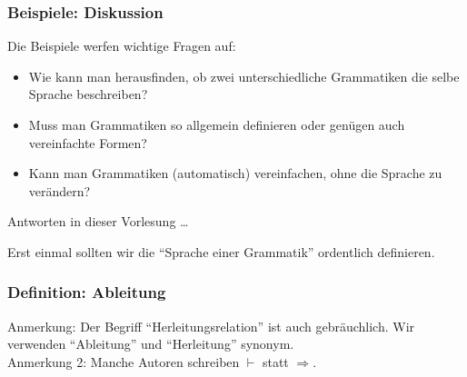 \documentclass[aspectratio=1610,onlymath]{beamer}
\begin{document}
\begin{frame}\frametitle{Beispiele: Diskussion}

Die Beispiele werfen \alert{wichtige Fragen} auf:
\begin{itemize}
\item Wie kann man herausfinden, ob zwei unterschiedliche Grammatiken die selbe Sprache beschreiben?
\item Muss man Grammatiken so allgemein definieren oder genügen auch vereinfachte Formen?
\item Kann man Grammatiken (automatisch) vereinfachen, ohne die Sprache zu verändern?
\end{itemize}

Antworten in dieser Vorlesung \ldots\bigskip

Erst einmal sollten wir die \alert{"`Sprache einer Grammatik"'} ordentlich definieren.

\end{frame}

\begin{frame}\frametitle{Definition: Ableitung}


\medskip


{\footnotesize \textcolor{devilscss}{Anmerkung: Der Begriff "`Herleitungsrelation"' ist auch gebräuchlich. Wir verwenden "`Ableitung"' und "`Herleitung"' synonym.\\
Anmerkung 2: Manche Autoren schreiben $\vdash$ statt $\Rightarrow$.}}

\end{frame}
\end{document}
